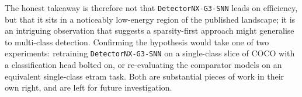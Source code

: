 The honest takeaway is therefore not that \texttt{DetectorNX-G3-SNN} leads on efficiency, but that it sits in a noticeably low-energy region of the published landscape; it is an intriguing observation that suggests a sparsity-first approach might generalise to multi-class detection. 
Confirming the hypothesis would take one of two experiments: retraining \texttt{DetectorNX-G3-SNN} on a single-class slice of COCO with a classification head bolted on, or re-evaluating the comparator models on an equivalent single-class \gls{etram} task. 
Both are substantial pieces of work in their own right, and are left for future investigation.